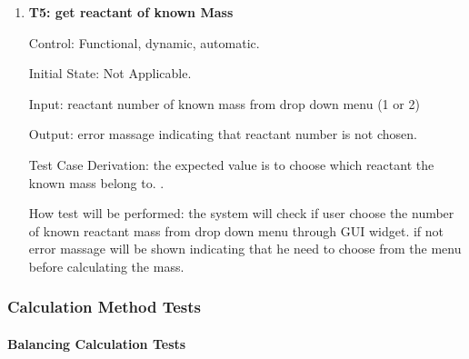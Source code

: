 \documentclass[12pt, titlepage]{article}
\begin{document}
\begin{enumerate}
\item{\bf T5: get reactant of known Mass  \\}

Control: Functional, dynamic, automatic.
					
Initial State: Not Applicable.
					
Input: reactant number of known mass from drop down menu (1 or 2) 

Output: error massage indicating that reactant number is not chosen.

Test Case Derivation: the expected value is to choose which reactant the known mass belong to. . 
					
How test will be performed: 
the system will check if user choose the number of known reactant mass from drop down menu through GUI widget. if not error massage will be shown indicating that he need to choose from the menu before calculating the mass. 

\end{enumerate}

\subsubsection{Calculation Method Tests}

\paragraph{Balancing Calculation Tests}
\end{document}
